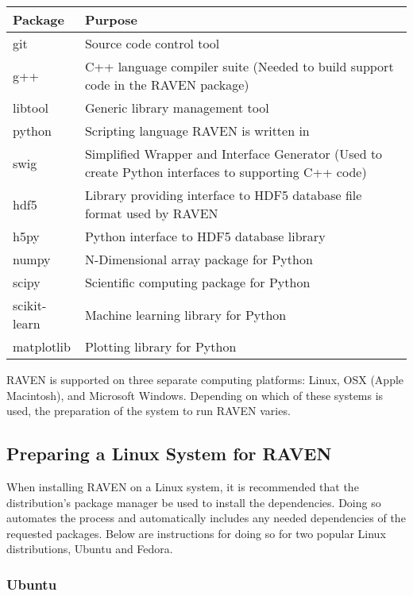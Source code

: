 \begin{center}
    \begin{tabular}{ | l | p{10cm} |}
    \hline Package & Purpose \\
    \hline git & Source code control tool \\
    \hline g++ & C++ language compiler suite (Needed to build
        support code in the RAVEN package) \\
    \hline libtool & Generic library management tool \\
    \hline python & Scripting language RAVEN is written in \\
    \hline swig & Simplified Wrapper and Interface Generator 
        (Used to create Python interfaces to supporting C++ code) \\
    \hline hdf5 & Library providing interface to HDF5 database 
        file format used by RAVEN \\
    \hline h5py & Python interface to HDF5 database library \\
    \hline numpy & N-Dimensional array package for Python \\
    \hline scipy &  Scientific computing package for Python \\
    \hline scikit-learn & Machine learning library for Python \\
    \hline matplotlib & Plotting library for Python \\
    \hline
    \end{tabular}
\end{center}


RAVEN is supported on three separate computing platforms:
Linux, OSX (Apple Macintosh), and Microsoft Windows.  Depending
on which of these systems is used, the preparation of the system 
to run RAVEN varies.

\subsection{Preparing a Linux System for RAVEN}
\label{sysprep_linux}

When installing RAVEN on a Linux system, it is recommended that the
distribution's package manager be used to install the dependencies.
Doing so automates the process and automatically includes any needed
dependencies of the requested packages.  Below are instructions for 
doing so for two popular Linux distributions, Ubuntu and Fedora.

\subsubsection{Ubuntu}

